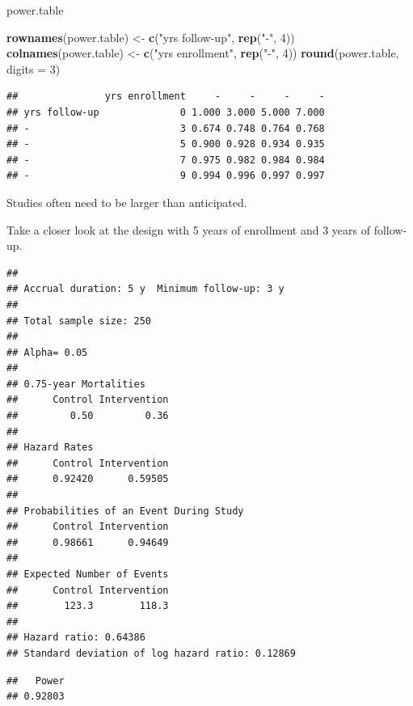 \documentclass[ignorenonframetext,]{beamer}
\newenvironment{Shaded}{\begin{snugshade}}{\end{snugshade}}
\newcommand{\DataTypeTok}[1]{\textcolor[rgb]{0.13,0.29,0.53}{#1}}
\newcommand{\DecValTok}[1]{\textcolor[rgb]{0.00,0.00,0.81}{#1}}
\newcommand{\KeywordTok}[1]{\textcolor[rgb]{0.13,0.29,0.53}{\textbf{#1}}}
\newcommand{\NormalTok}[1]{#1}
\newcommand{\StringTok}[1]{\textcolor[rgb]{0.31,0.60,0.02}{#1}}
\begin{document}
\begin{frame}[fragile]
\begin{Shaded}
\begin{Highlighting}[]
\NormalTok{power.table }
\end{Highlighting}
\end{Shaded}

\end{frame}

\begin{frame}[fragile]

\scriptsize

\begin{Shaded}
\begin{Highlighting}[]
\KeywordTok{rownames}\NormalTok{(power.table) <-}\StringTok{ }\KeywordTok{c}\NormalTok{(}\StringTok{"yrs follow-up"}\NormalTok{, }\KeywordTok{rep}\NormalTok{(}\StringTok{"-"}\NormalTok{, }\DecValTok{4}\NormalTok{))}
\KeywordTok{colnames}\NormalTok{(power.table) <-}\StringTok{ }\KeywordTok{c}\NormalTok{(}\StringTok{"yrs enrollment"}\NormalTok{, }\KeywordTok{rep}\NormalTok{(}\StringTok{"-"}\NormalTok{, }\DecValTok{4}\NormalTok{))}
\KeywordTok{round}\NormalTok{(power.table, }\DataTypeTok{digits =} \DecValTok{3}\NormalTok{)}
\end{Highlighting}
\end{Shaded}

\begin{verbatim}
##               yrs enrollment     -     -     -     -
## yrs follow-up              0 1.000 3.000 5.000 7.000
## -                          3 0.674 0.748 0.764 0.768
## -                          5 0.900 0.928 0.934 0.935
## -                          7 0.975 0.982 0.984 0.984
## -                          9 0.994 0.996 0.997 0.997
\end{verbatim}

\normalsize

Studies often need to be larger than anticipated.

Take a closer look at the design with 5 years of enrollment and 3 years
of follow-up.

\end{frame}

\begin{frame}[fragile]

\scriptsize

\begin{verbatim}
## 
## Accrual duration: 5 y  Minimum follow-up: 3 y
## 
## Total sample size: 250 
## 
## Alpha= 0.05 
## 
## 0.75-year Mortalities
##      Control Intervention 
##         0.50         0.36 
## 
## Hazard Rates
##      Control Intervention 
##      0.92420      0.59505 
## 
## Probabilities of an Event During Study
##      Control Intervention 
##      0.98661      0.94649 
## 
## Expected Number of Events
##      Control Intervention 
##        123.3        118.3 
## 
## Hazard ratio: 0.64386 
## Standard deviation of log hazard ratio: 0.12869
\end{verbatim}

\begin{verbatim}
##   Power 
## 0.92803
\end{verbatim}

\end{frame}
\end{document}
